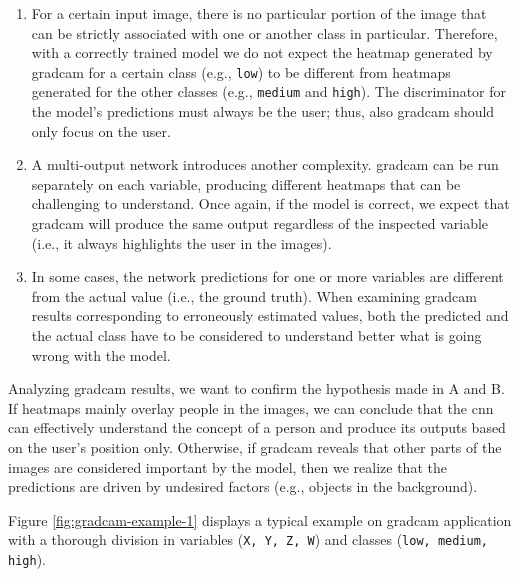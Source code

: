 \renewcommand{\labelenumi}{\Alph{enumi}}
\begin{enumerate}
    \item For a certain input image, there is no particular portion of the image that can be strictly associated with one or another class in particular. Therefore, with a correctly trained model we do not expect the heatmap generated by \gls{gradcam} for a certain class (e.g., \texttt{low}) to be different from heatmaps generated for the other classes (e.g., \texttt{medium} and \texttt{high}). The discriminator for the model's predictions must always be the user; thus, also \gls{gradcam} should only focus on the user.
    \item A multi-output network introduces another complexity. \gls{gradcam} can be run separately on each variable, producing different heatmaps that can be challenging to understand. Once again, if the model is correct, we expect that \gls{gradcam} will produce the same output regardless of the inspected variable (i.e., it always highlights the user in the images).
    \item In some cases, the network predictions for one or more variables are different from the actual value (i.e., the ground truth). When examining \gls{gradcam} results corresponding to erroneously estimated values, both the predicted and the actual class have to be considered to understand better what is going wrong with the model.
\end{enumerate}

\clearpage

Analyzing \gls{gradcam} results, we want to confirm the hypothesis made in A and B. If heatmaps mainly overlay people in the images, we can conclude that the \gls{cnn} can effectively understand the concept of a person and produce its outputs based on the user's position only. Otherwise, if \gls{gradcam} reveals that other parts of the images are considered important by the model, then we realize that the predictions are driven by undesired factors (e.g., objects in the background).

\medskip

Figure \ref{fig:gradcam-example-1} displays a typical example on \gls{gradcam} application with a thorough division in variables (\texttt{X, Y, Z, W}) and classes (\texttt{low, medium, high}).

